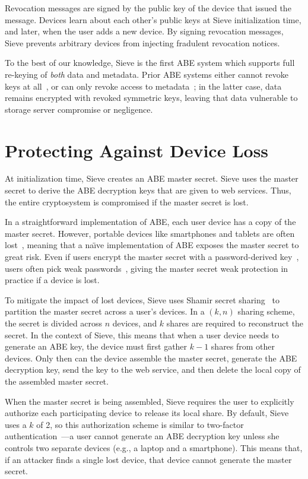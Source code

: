 Revocation messages are signed by the public
key of the device that issued the message.
Devices learn about each other's public keys
at Sieve initialization time, and later, when
the user adds a new device. By signing revocation
messages, Sieve prevents arbitrary devices
from injecting fradulent revocation notices.

To the best of our knowledge, Sieve is the
first ABE system which supports full re-keying
of \emph{both} data and metadata. Prior ABE systems either
cannot revoke keys at all~\cite{privio}, or can
only revoke access to metadata~\cite{persona,aauth,cachet};
in the latter case, data remains encrypted with
revoked symmetric keys, leaving that data vulnerable
to storage server compromise or negligence.


\section{Protecting Against Device Loss}
\label{sec:secretSharing}

At initialization time, Sieve creates an ABE
master secret. Sieve uses the master secret
to derive the ABE decryption keys that are
given to web services. Thus, the entire
cryptosystem is compromised if the master
secret is lost.

In a straightforward implementation of ABE, each
user device has a copy of the master secret.
However, portable devices like smartphones and
tablets are often lost~\cite{wang2012smartphone},
meaning that a na\"{\i}ve implementation of ABE
exposes the master secret to great risk. Even if
users encrypt the master secret with a
password-derived key~\cite{pbkdf}, users often
pick weak passwords~\cite{gaw2006password},
giving the master secret weak protection in
practice if a device is lost.

To mitigate the impact of lost devices, Sieve
uses Shamir secret sharing~\cite{shamir} to
partition the master secret across a user's
devices. In a $(k,n)$ sharing scheme, the
secret is divided across $n$ devices, and
$k$ shares are required to reconstruct the
secret. In the context of Sieve, this means
that when a user device needs to generate
an ABE key, the device must first gather $k-1$
shares from other devices. Only then can the
device assemble the master secret, generate
the ABE decryption key, send the key to the
web service, and then delete the local copy
of the assembled master secret.

When the master secret is being assembled,
Sieve requires the user to explicitly authorize
each participating device to release its local
share. By default, Sieve uses a $k$ of 2, so
this authorization scheme is similar to
two-factor authentication~\cite{twofactor}---a user
cannot generate an ABE decryption key unless
she controls two separate devices (e.g., a
laptop and a smartphone). This means that,
if an attacker finds a single lost device,
that device cannot generate the master secret.

